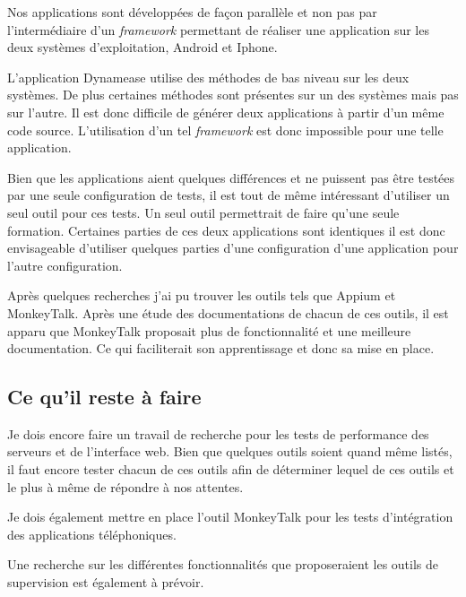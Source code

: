 Nos applications sont développées de façon parallèle et non pas par l'intermédiaire d'un \textit{framework} permettant de réaliser une application sur les deux systèmes d'exploitation, Android et Iphone. 

L'application Dynamease utilise des méthodes de bas niveau sur les deux systèmes. De plus certaines méthodes sont présentes sur un des systèmes mais pas sur l'autre. Il est donc difficile de générer deux applications à partir d'un même code source. L'utilisation d'un tel \textit{framework} est donc impossible pour une telle application.

Bien que les applications aient quelques différences et ne puissent pas être testées par une seule configuration de tests, il est tout de même intéressant d'utiliser un seul outil pour ces tests. Un seul outil permettrait de faire qu'une seule formation. Certaines parties de ces deux applications sont identiques il est donc envisageable d'utiliser quelques parties d'une configuration d'une application pour l'autre configuration.

Après quelques recherches j'ai pu trouver les outils tels que Appium et MonkeyTalk. Après une étude des documentations de chacun de ces outils, il est apparu que MonkeyTalk proposait plus de fonctionnalité et une meilleure documentation. Ce qui faciliterait son apprentissage et donc sa mise en place.


\subsection{Ce qu'il reste à faire}

Je dois encore faire un travail de recherche pour les tests de performance des serveurs et de l'interface web. Bien que quelques outils soient quand même listés, il faut encore tester chacun de ces outils afin de déterminer lequel de ces outils et le plus à même de répondre à nos attentes.

Je dois également mettre en place l'outil MonkeyTalk pour les tests d'intégration des applications téléphoniques.

Une recherche sur les différentes fonctionnalités que proposeraient les outils de supervision est également à prévoir. 